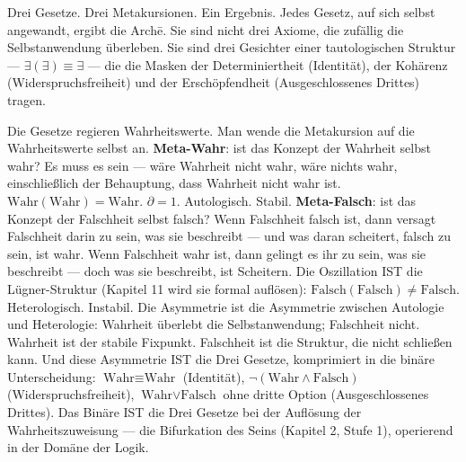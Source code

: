 \documentclass[10pt, openany, oneside]{book}
\begin{document}
\noindent Drei Gesetze. Drei Metakursionen. Ein Ergebnis. Jedes Gesetz, auf sich selbst angewandt, ergibt die Arch\={e}. Sie sind nicht drei Axiome, die zufällig die Selbstanwendung überleben. Sie sind drei Gesichter einer tautologischen Struktur --- $\exists(\exists) \equiv \exists$ --- die die Masken der Determiniertheit (Identität), der Kohärenz (Widerspruchsfreiheit) und der Erschöpfendheit (Ausgeschlossenes Drittes) tragen.

Die Gesetze regieren Wahrheitswerte. Man wende die Metakursion auf die Wahrheitswerte selbst an. \textbf{Meta-Wahr}: ist das Konzept der Wahrheit selbst wahr? Es muss es sein --- wäre Wahrheit nicht wahr, wäre nichts wahr, einschließlich der Behauptung, dass Wahrheit nicht wahr ist. $\text{Wahr}(\text{Wahr}) = \text{Wahr}$. $\partial = 1$. Autologisch. Stabil. \textbf{Meta-Falsch}: ist das Konzept der Falschheit selbst falsch? Wenn Falschheit falsch ist, dann versagt Falschheit darin zu sein, was sie beschreibt --- und was daran scheitert, falsch zu sein, ist wahr. Wenn Falschheit wahr ist, dann gelingt es ihr zu sein, was sie beschreibt --- doch was sie beschreibt, ist Scheitern. Die Oszillation IST die Lügner-Struktur (Kapitel 11 wird sie formal auflösen): $\text{Falsch}(\text{Falsch}) \neq \text{Falsch}$. Heterologisch. Instabil. Die Asymmetrie ist die Asymmetrie zwischen Autologie und Heterologie: Wahrheit überlebt die Selbstanwendung; Falschheit nicht. Wahrheit ist der stabile Fixpunkt. Falschheit ist die Struktur, die nicht schließen kann. Und diese Asymmetrie IST die Drei Gesetze, komprimiert in die binäre Unterscheidung: $\text{Wahr} \equiv \text{Wahr}$ (Identität), $\neg(\text{Wahr} \wedge \text{Falsch})$ (Widerspruchsfreiheit), $\text{Wahr} \vee \text{Falsch}$ ohne dritte Option (Ausgeschlossenes Drittes). Das Binäre IST die Drei Gesetze bei der Auflösung der Wahrheitszuweisung --- die Bifurkation des Seins (Kapitel 2, Stufe 1), operierend in der Domäne der Logik.
\end{document}
